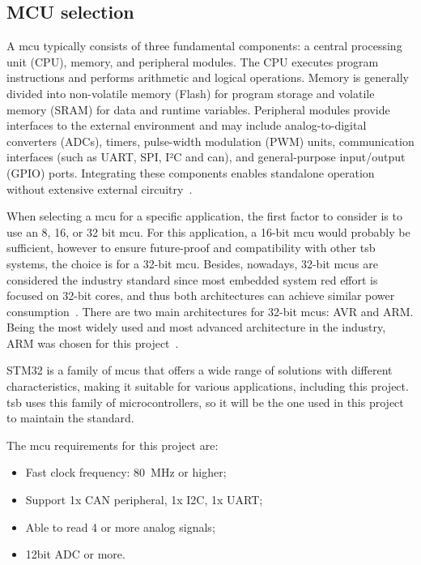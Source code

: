     \subsection{MCU selection}

        A \acf{mcu} typically consists of three fundamental components: a central processing unit (CPU), memory, and peripheral modules. The CPU executes program instructions and performs arithmetic and logical operations. Memory is generally divided into non-volatile memory (Flash) for program storage and volatile memory (SRAM) for data and runtime variables. Peripheral modules provide interfaces to the external environment and may include analog-to-digital converters (ADCs), timers, pulse-width modulation (PWM) units, communication interfaces (such as UART, SPI, I²C and \acs{can}), and general-purpose input/output (GPIO) ports. Integrating these components enables standalone operation without extensive external circuitry~\cite{ibm_microcontroller_2025}.

        When selecting a \acs{mcu} for a specific application, the first factor to consider is to use an 8, 16, or 32 bit \acs{mcu}. For this application, a 16-bit \acs{mcu} would probably be sufficient, however to ensure future-proof and compatibility with other \ac{tsb} systems, the choice is for a 32-bit \ac{mcu}. Besides, nowadays, 32-bit \acp{mcu} are considered the industry standard since most embedded system \ac{red} effort is focused on 32-bit cores, and thus both architectures can achieve similar power consumption~\cite{embedded_upgrading_mcu_designs_2025}.
          There are two main architectures for 32-bit \acp{mcu}: AVR and ARM. Being the most widely used and most advanced architecture in the industry, ARM was chosen for this project~\cite{ampheo_fpga_vs_microcontroller_2025}. 

        STM32 is a family of \acp{mcu} that offers a wide range of solutions with different characteristics, making it suitable for various applications, including this project. \ac{tsb} uses this family of microcontrollers, so it will be the one used in this project to maintain the standard. 

        The \ac{mcu} requirements for this project are:
        \begin{itemize}[leftmargin=4em, itemsep=1pt, topsep=2pt]
            \item Fast clock frequency: 80~MHz or higher;
            \item Support 1x CAN peripheral, 1x I2C, 1x UART;
            \item Able to read 4 or more analog signals;
            \item 12bit ADC or more.
        \end{itemize}

